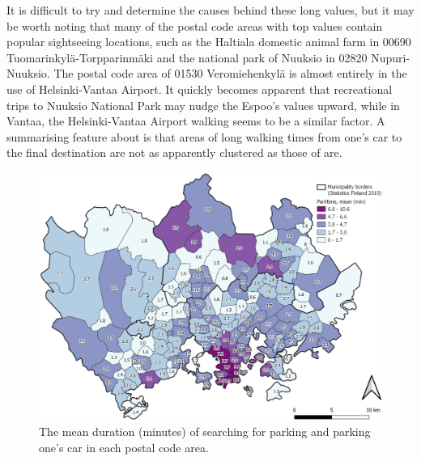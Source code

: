 It is difficult to try and determine the causes behind these long  values, but it may be worth noting that many of the postal code areas with top values contain popular sightseeing locations, such as the Haltiala domestic animal farm in 00690 Tuomarinkylä-Torpparinmäki and the national park of Nuuksio in 02820 Nupuri-Nuuksio. The postal code area of 01530 Veromiehenkylä is almost entirely in the use of Helsinki-Vantaa Airport. It quickly becomes apparent that recreational trips to Nuuksio National Park may nudge the Espoo's  values upward, while in Vantaa, the Helsinki-Vantaa Airport walking seems to be a similar factor. A summarising feature about  is that areas of long walking times from one's car to the final destination are not as apparently clustered as those of  are.


\begin{figure}[H]%
    \centering
    \includegraphics[width=\textwidth]{images/thesis_postalvis_parkmean.png}
    \caption[Parktime, mean, in the reseach area]{The mean duration (minutes) of searching for parking and parking one's car in each postal code area.}%
    \label{fig:postalvis_parkmean}%
\end{figure}

